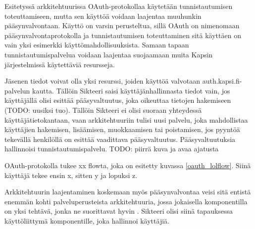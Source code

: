 Esitetyssä arkkitehtuurissa OAuth-protokollaa käytetään tunnistautumisen toteuttamiseen, mutta sen käyttöä voidaan laajentaa muuhunkin pääsynvalvontaan. Käyttö on varsin perusteltua, sillä OAuth on nimenomaan pääsynvalvontaprotokolla ja tunnistautumisen toteuttaminen sitä käyttäen on vain yksi esimerkki käyttömahdollisuuksista. Samaan tapaan tunnistautumispalvelua voidaan laajentaa suojaamaan muita Kapsin järjestelmissä käytettäviä resursseja.

Jäsenen tiedot voivat olla yksi resurssi, joiden käyttöä valvotaan auth.kapsi.fi-pal\-ve\-lun kautta. Tällöin Sikteeri saisi käyttäjänhallinnasta tiedot vain, jos käyttäjällä olisi esittää pääsyvaltuutus, joka oikeuttaa tietojen hakemiseen (TODO: uusiksi tuo). Tällöin Sikteeri ei olisi suoraan yhteydessä käyttäjätietokantaan, vaan arkkitehtuuriin tulisi uusi palvelu, joka mahdollistaa käyttäjien hakemisen, lisäämisen, muokkaamisen tai poistamisen, jos pyyntöä tekevällä henkilöllä on esittää vaadittava pääsyvaltuutus. Pääsyvaltuutuksia hallinnoisi tunnistautumispalvelu. TODO: piirrä kuva ja avaa ajatusta

OAuth-protokolla tukee xx flowta, joka on esitetty kuvassa \ref{oauth_lolflow}. Siinä käyttäjä tekee ensin x, sitten y ja lopuksi z.

Arkkitehtuurin laajentaminen koskemaan myös pääsynvalvontaa veisi sitä entistä enemmän kohti palveluperusteista arkkitehtuuria, jossa jokaisella komponentilla on yksi tehtävä, jonka ne suorittavat hyvin \cite{soa}. Sikteeri olisi siinä tapauksessa käyttöliittymä komponentille, joka hallinnoi käyttäjiä.